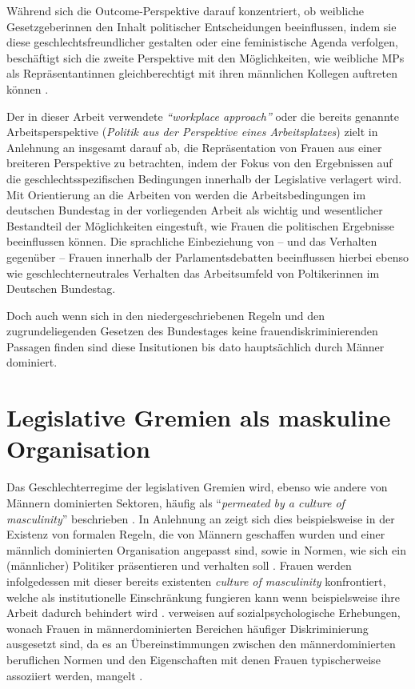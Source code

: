 \documentclass[12pt, 
    twoside=false, 
    bibliography=totoc, 
    numbers=endperiod, 
    headings=normal, 
    toc=chapterentrydotfill
    ]{scrbook}
\begin{document}
Während sich die Outcome-Perspektive darauf konzentriert, ob weibliche Gesetzgeberinnen den Inhalt politischer Entscheidungen beeinflussen, indem sie diese geschlechtsfreundlicher gestalten oder eine feministische Agenda verfolgen, beschäftigt sich die zweite Perspektive mit den Möglichkeiten, wie weibliche MPs als Repräsentantinnen gleichberechtigt mit ihren männlichen Kollegen auftreten können \parencites[199]{erikson_2018}{dahlerup_2006}{dahlerup_1988}.

Der in dieser Arbeit verwendete \emph{\enquote{workplace approach}} oder die bereits genannte Arbeitsperspektive  (\emph{Politik aus der Perspektive eines Arbeitsplatzes}) zielt in Anlehnung an \textcite{erikson_2018} insgesamt darauf ab, die Repräsentation von Frauen aus einer breiteren Perspektive zu betrachten, indem der Fokus von den Ergebnissen auf die geschlechtsspezifischen Bedingungen innerhalb der Legislative verlagert wird. Mit Orientierung an die Arbeiten von \textcites{dahlerup_2006}{dahlerup_1988}{erikson_2018} werden die  Arbeitsbedingungen im deutschen Bundestag in der vorliegenden Arbeit als wichtig und wesentlicher Bestandteil der Möglichkeiten eingestuft, wie Frauen die politischen Ergebnisse beeinflussen können. Die sprachliche Einbeziehung von -- und das Verhalten gegenüber -- Frauen innerhalb der Parlamentsdebatten beeinflussen hierbei ebenso wie geschlechterneutrales Verhalten das Arbeitsumfeld von Poltikerinnen im Deutschen Bundestag.

Doch auch wenn sich in den niedergeschriebenen Regeln und den zugrundeliegenden Gesetzen des Bundestages keine frauendiskriminierenden Passagen finden sind diese Insitutionen bis dato hauptsächlich durch Männer dominiert.

\section{Legislative Gremien als maskuline Organisation}


Das Geschlechterregime der legislativen Gremien wird, ebenso wie andere von Männern dominierten Sektoren, häufig als \enquote{\emph{permeated by a culture of masculinity}} beschrieben \parencites[200]{erikson_2018}{lovenduski_2005}.
In Anlehnung an \textcite{acker_1990} zeigt sich dies beispielsweise in der Existenz von formalen Regeln, die von Männern geschaffen wurden und einer männlich dominierten Organisation angepasst sind, sowie in Normen, wie sich ein (männlicher) Politiker präsentieren und verhalten soll \parencites[200]{erikson_2018}[48]{acker_1990}. Frauen werden infolgedessen mit dieser bereits existenten \emph{culture of masculinity} konfrontiert, welche als institutionelle Einschränkung fungieren kann wenn beispielsweise ihre Arbeit dadurch behindert wird \parencites[200]{erikson_2018}[47-56]{lovenduski_2005}. \textcite{erikson_2018} verweisen auf sozialpsychologische Erhebungen, wonach Frauen in männerdominierten Bereichen häufiger Diskriminierung ausgesetzt sind, da es an Übereinstimmungen zwischen den männerdominierten beruflichen Normen und den Eigenschaften mit denen Frauen typischerweise assoziiert werden, mangelt \parencites[vgl.][]{burgess_1999}{eagly_2002}{heilman_2001}{heilman_2004}. 
\\
\end{document}
